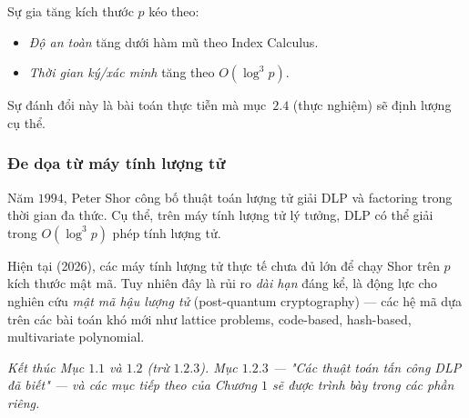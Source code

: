 \documentclass[12pt,a4paper]{report}
\theoremstyle{definition}
\theoremstyle{remark}
\begin{document}
Sự gia tăng kích thước $p$ kéo theo:
\begin{itemize}[leftmargin=*]
    \item \emph{Độ an toàn} tăng dưới hàm mũ theo Index Calculus.
    \item \emph{Thời gian ký/xác minh} tăng theo $O(\log^3 p)$.
\end{itemize}
Sự đánh đổi này là bài toán thực tiễn mà mục~$2.4$ (thực nghiệm) sẽ định lượng cụ thể.

\subsubsection{Đe dọa từ máy tính lượng tử}

Năm $1994$, Peter Shor công bố thuật toán lượng tử giải DLP và factoring trong thời gian đa thức. Cụ thể, trên máy tính lượng tử lý tưởng, DLP có thể giải trong $O(\log^3 p)$ phép tính lượng tử.

Hiện tại (2026), các máy tính lượng tử thực tế chưa đủ lớn để chạy Shor trên $p$ kích thước mật mã. Tuy nhiên đây là rủi ro \emph{dài hạn} đáng kể, là động lực cho nghiên cứu \emph{mật mã hậu lượng tử} (post-quantum cryptography) --- các hệ mã dựa trên các bài toán khó mới như lattice problems, code-based, hash-based, multivariate polynomial.

\bigskip

\noindent\hrulefill

\noindent\small\textit{Kết thúc Mục $1.1$ và $1.2$ (trừ $1.2.3$). Mục $1.2.3$ --- "Các thuật toán tấn công DLP đã biết" --- và các mục tiếp theo của Chương $1$ sẽ được trình bày trong các phần riêng.}
\end{document}
